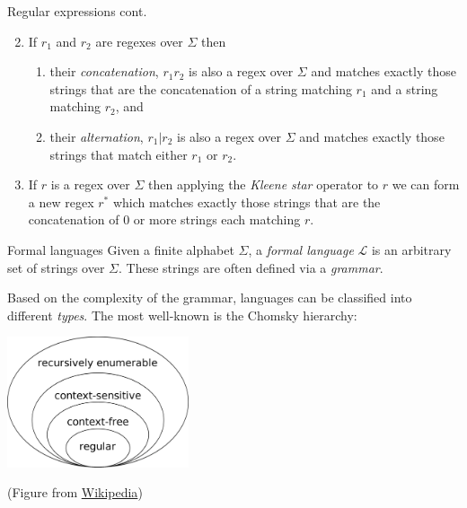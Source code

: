 \documentclass[style=upen, size=14pt]{powerdot}
\newcommand{\gold}{\color{arany}}
\theoremstyle{definition}
\begin{document}
\begin{slide}[toc=]{Regular expressions cont.}
  \begin{enumerate}
     \setcounter{enumi}{1}
  \item If $r_1$ and $r_2$ are regexes over $\Sigma$ then
    \begin{enumerate}
    \item their \emph{\gold concatenation}, $r_1 r_2$ is also a regex over $\Sigma$ and
      matches exactly those strings that are the concatenation of a string
      matching $r_1$ and a string matching $r_2$, and
    \item their \emph{\gold alternation}, $r_1 \vert r_2$ is also a regex over
      $\Sigma$ and matches exactly those strings that match either $r_1$ or
      $r_2$.
    \end{enumerate}
  \item If $r$ is a regex over $\Sigma$ then applying the \emph{\gold Kleene
      star} operator to $r$ we can form a new regex $r^*$ which matches exactly
    those strings that are the concatenation of 0 or more strings each
    matching $r$.
  \end{enumerate}
\end{slide}

\begin{slide}[toc=]{Formal languages}
  Given a finite alphabet $\Sigma$, a \textit{formal language} $\mathcal L$
  is an arbitrary set of strings over $\Sigma$. These strings are often
  defined via a \textit{grammar}. \medskip

  Based on the complexity of the grammar, languages can be classified into
  different \textit{types}. The most well-known is the Chomsky hierarchy:

  \begin{center}
    \includegraphics[width=0.4\textwidth]{figures/chomsky_hierarchy.eps}

    \footnotesize{(Figure from \href{https://en.wikipedia.org/wiki/Chomsky_hierarchy}{Wikipedia})}
  \end{center}
\end{slide}
\end{document}
